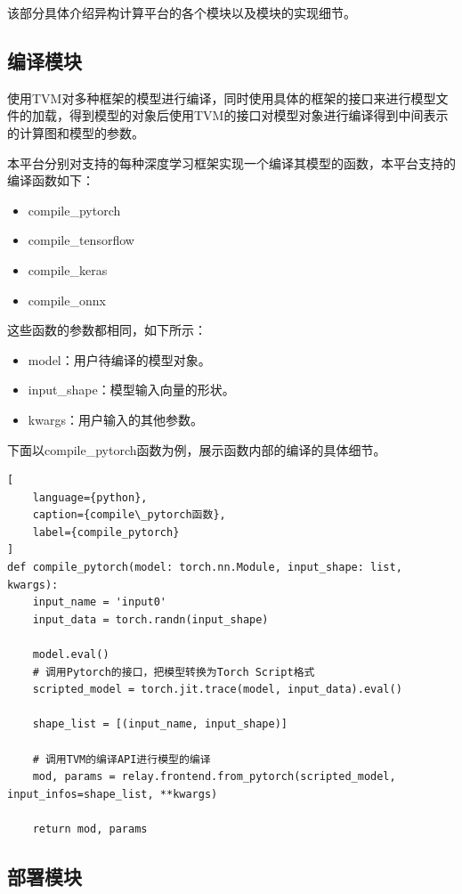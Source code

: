 该部分具体介绍异构计算平台的各个模块以及模块的实现细节。

\subsection{编译模块}

使用TVM对多种框架的模型进行编译，同时使用具体的框架的接口来进行模型文件的加载，得到模型的对象后使用TVM的接口对模型对象进行编译得到中间表示的计算图和模型的参数。

本平台分别对支持的每种深度学习框架实现一个编译其模型的函数，本平台支持的编译函数如下：
\begin{itemize}
    \item {compile\_pytorch}
    \item {compile\_tensorflow}
    \item {compile\_keras}
    \item {compile\_onnx}
\end{itemize}

这些函数的参数都相同，如下所示：
\begin{itemize}
    \item {model：用户待编译的模型对象。}
    \item {input\_shape：模型输入向量的形状。}
    \item {kwargs：用户输入的其他参数。}
\end{itemize}

下面以compile\_pytorch函数为例，展示函数内部的编译的具体细节。

\begin{lstlisting}[
    language={python},
    caption={compile\_pytorch函数},
    label={compile_pytorch}
]
def compile_pytorch(model: torch.nn.Module, input_shape: list, kwargs):
    input_name = 'input0'
    input_data = torch.randn(input_shape)
    
    model.eval()
    # 调用Pytorch的接口，把模型转换为Torch Script格式
    scripted_model = torch.jit.trace(model, input_data).eval()

    shape_list = [(input_name, input_shape)]

    # 调用TVM的编译API进行模型的编译
    mod, params = relay.frontend.from_pytorch(scripted_model, input_infos=shape_list, **kwargs)

    return mod, params
\end{lstlisting}


\subsection{部署模块}


